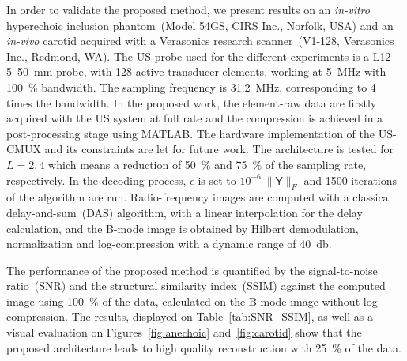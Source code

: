 \documentclass[9pt,conference]{IEEEtran}
\begin{document}
In order to validate the proposed method, we present results on an \textit{in-vitro} hyperechoic inclusion phantom~(Model 54GS, CIRS Inc., Norfolk, USA) and an \textit{in-vivo} carotid acquired with a Verasonics research scanner~(V1-128, Verasonics Inc., Redmond, WA). The US probe used for the different experiments is a L12-5~\SI{50}{\milli\metre} probe, with 128 active transducer-elements, working at \SI{5}{\mega\hertz} with \SI{100}{\percent} bandwidth. The sampling frequency is \SI{31.2}{\mega\hertz}, corresponding to 4 times the bandwidth. 
In the proposed work, the element-raw data are firstly acquired with the US system at full rate and the compression is achieved in a post-processing stage using MATLAB. The hardware implementation of the US-CMUX and its constraints are let for future work. The architecture is tested for $L = 2, 4$ which means a reduction of \SI{50}{\percent} and \SI{75}{\percent} of the sampling rate, respectively. In the decoding process, $\epsilon$ is set to $10^{-6}~\|\mathsf{Y}\|_F$ and \num{1500} iterations of the algorithm are run. 
Radio-frequency images are computed with a classical delay-and-sum~(DAS) algorithm, with a linear interpolation for the delay calculation, and the B-mode image is obtained by Hilbert demodulation, normalization and log-compression with a dynamic range of \SI{40}{\decibel}.

The performance of the proposed method is quantified by the signal-to-noise ratio~(SNR) and the structural similarity index~(SSIM) against the computed image using \SI{100}{\percent} of the data, calculated on the B-mode image without log-compression. The results, displayed on Table~\ref{tab:SNR_SSIM}, as well as a visual evaluation on Figures~\ref{fig:anechoic} and~\ref{fig:carotid} show that the proposed architecture leads to high quality reconstruction with \SI{25}{\percent} of the data. 
\end{document}
